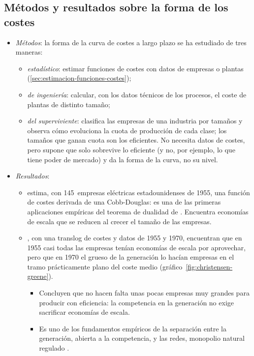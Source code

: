 \documentclass[11pt]{article}
\begin{document}
\subsection{Métodos y resultados sobre la forma de los costes}\label{anexo:empirica-escala}

\begin{itemize}
\item \emph{Métodos}: la forma de la curva de costes a largo plazo se ha estudiado de tres maneras\nocite{Stigler1958Economies}:
  \begin{itemize}
  \item \emph{estadístico}: estimar funciones de costes con datos de empresas o plantas (\ref{sec:estimacion-funciones-costes});
  \item \emph{de ingeniería}: calcular, con los datos técnicos de los procesos, el coste de plantas de distinto tamaño;
  \item \emph{del superviviente}: \textcite{Stigler1958Economies} clasifica las empresas de una industria por tamaños y observa cómo evoluciona la cuota de producción de cada clase; los tamaños que ganan cuota son los eficientes. No necesita datos de costes, pero supone que solo sobrevive lo eficiente (y no, por ejemplo, lo que tiene poder de mercado) y da la forma de la curva, no su nivel.
  \end{itemize}
\item \emph{Resultados}:
  \begin{itemize}
  \item \textcite{Nerlove1963Returns} estima, con 145~empresas eléctricas estadounidenses de 1955, una función de costes derivada de una Cobb-Douglas: es una de las primeras aplicaciones empíricas del teorema de dualidad de . Encuentra economías de escala que se reducen al crecer el tamaño de las empresas.
  \item \textcite{ChristensenGreene1976Economies}, con una translog de costes y datos de 1955 y 1970, encuentran que en 1955 casi todas las empresas tenían economías de escala por aprovechar, pero que en 1970 el grueso de la generación lo hacían empresas en el tramo prácticamente plano del coste medio (gráfico~\ref{fig:christensen-greene}).
    \begin{itemize}
    \item Concluyen que no hacen falta unas pocas empresas muy grandes para producir con eficiencia: la competencia en la generación no exige sacrificar economías de escala.
    \item Es uno de los fundamentos empíricos de la separación entre la generación, abierta a la competencia, y las redes, monopolio natural regulado  .

\end{itemize}
\end{itemize}
\end{itemize}
\end{document}
